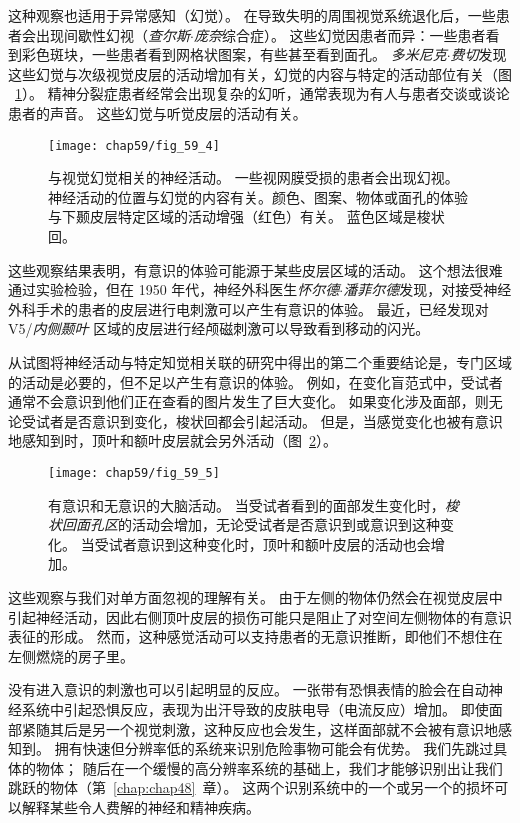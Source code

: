 这种观察也适用于异常感知（幻觉）。
在导致失明的周围视觉系统退化后，一些患者会出现间歇性幻视（\textit{查尔斯$\cdot$庞奈}综合症）。
这些幻觉因患者而异：一些患者看到彩色斑块，一些患者看到网格状图案，有些甚至看到面孔。
\textit{多米尼克$\cdot$费切}发现这些幻觉与次级视觉皮层的活动增加有关，幻觉的内容与特定的活动部位有关（图 ~\ref{fig:59_4}）。
精神分裂症患者经常会出现复杂的幻听，通常表现为有人与患者交谈或谈论患者的声音。
这些幻觉与听觉皮层的活动有关。


\begin{figure}[htbp]
	\centering
	\texttt{[image: chap59/fig\_59\_4]}
	\caption{与视觉幻觉相关的神经活动。
		一些视网膜受损的患者会出现幻视。
		神经活动的位置与幻觉的内容有关。颜色、图案、物体或面孔的体验与下颞皮层特定区域的活动增强（红色）有关。
		蓝色区域是梭状回\cite{howard1998anatomy}。}
	\label{fig:59_4}
\end{figure}


这些观察结果表明，有意识的体验可能源于某些皮层区域的活动。
这个想法很难通过实验检验，但在 1950 年代，神经外科医生\textit{怀尔德$\cdot$潘菲尔德}发现，对接受神经外科手术的患者的皮层进行电刺激可以产生有意识的体验。
最近，已经发现对 V5/\textit{内侧颞叶} 区域的皮层进行经颅磁刺激可以导致看到移动的闪光。


从试图将神经活动与特定知觉相关联的研究中得出的第二个重要结论是，专门区域的活动是必要的，但不足以产生有意识的体验。
例如，在变化盲范式中，受试者通常不会意识到他们正在查看的图片发生了巨大变化。
如果变化涉及面部，则无论受试者是否意识到变化，梭状回都会引起活动。
但是，当感觉变化也被有意识地感知到时，顶叶和额叶皮层就会另外活动（图~\ref{fig:59_5}）。


\begin{figure}[htbp]
	\centering
	\texttt{[image: chap59/fig\_59\_5]}
	\caption{有意识和无意识的大脑活动。
		当受试者看到的面部发生变化时，\textit{梭状回面孔区}的活动会增加，无论受试者是否意识到或意识到这种变化。
		当受试者意识到这种变化时，顶叶和额叶皮层的活动也会增加\cite{beck2001neural}。}
	\label{fig:59_5}
\end{figure}


这些观察与我们对单方面忽视的理解有关。
由于左侧的物体仍然会在视觉皮层中引起神经活动，因此右侧顶叶皮层的损伤可能只是阻止了对空间左侧物体的有意识表征的形成。
然而，这种感觉活动可以支持患者的无意识推断，即他们不想住在左侧燃烧的房子里。


没有进入意识的刺激也可以引起明显的反应。
一张带有恐惧表情的脸会在自动神经系统中引起恐惧反应，表现为出汗导致的皮肤电导（电流反应）增加。
即使面部紧随其后是另一个视觉刺激，这种反应也会发生，这样面部就不会被有意识地感知到。
拥有快速但分辨率低的系统来识别危险事物可能会有优势。
我们先跳过具体的物体；
随后在一个缓慢的高分辨率系统的基础上，我们才能够识别出让我们跳跃的物体（第~\ref{chap:chap48}~章）。
这两个识别系统中的一个或另一个的损坏可以解释某些令人费解的神经和精神疾病。


